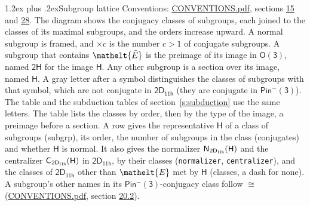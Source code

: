 \documentclass[10pt,a4paper]{article}
\makeatletter
\renewcommand\section{\@startsection{section}{1}{\z@}{-3ex plus -1ex minus -.2ex}%
  {1.2ex plus .2ex}{\normalfont\large\sffamily\bfseries\color{parttitle}}}
\numberwithin{equation}{section}
\newcommand{\eltfont}[1]{{\let\sigma\eltsigma\mathelt{#1}}}
\newcommand{\grp}[1]{\mathsf{#1}}
\newcommand{\cls}[1]{\eltfont{#1}}
\newcommand{\elt}[1]{\eltfont{#1}}
\newcommand{\samecls}{\cong}
\newcommand{\barred}[1]{\bar{#1}}
\newcommand{\hairsp}{\mkern1mu}
\makeatother
\begin{document}
\section{Subgroup lattice}\label{s:subgroups}
Conventions: \href{../../CONVENTIONS.pdf}{CONVENTIONS.pdf}, sections \href{../../../rotation/CONVENTIONS.pdf\#conv.15}{15} and \href{../../CONVENTIONS.pdf\#conv.28}{28}.
The diagram shows the conjugacy classes of subgroups, each joined to the classes of its maximal subgroups, and the orders increase upward. A normal subgroup is framed, and ${\times}c$ is the number $c > 1$ of conjugate subgroups. \label{n:group.H}A subgroup that contains $\elt{\barred{E}}$ is the preimage of its image in $\grp{O(3)}$, named $\grp{2H}$ for the image $\grp{H}$. Any other subgroup is a section over its image, named $\grp{H}$. \label{n:mark.letter}A gray letter after a symbol distinguishes the classes of subgroups with that symbol, which are not conjugate in $\grp{2D_{11h}}$ (they are conjugate in \href{Pinminus3.pdf}{$\grp{Pin^{-}(3)}$}). The table and the subduction tables of section~\ref{s:subduction} use the same letters. The table lists the classes by order, then by the type of the image, a preimage before a section. \label{n:head.subgroup}\label{n:head.order}\label{n:head.conjugates}\label{n:head.normal}A row gives the representative $\grp{H}$ of a class of subgroups (subgrp), its order, the number of subgroups in the class (conjugates) and whether $\grp{H}$ is normal. \label{n:group.normalizer}\label{n:group.centralizer}\label{n:head.classes}It also gives the normalizer $\grp{N}_{\hairsp \grp{2D_{11h}}}(\grp{H})$ and the centralizer $\grp{C}_{\hairsp \grp{2D_{11h}}}(\grp{H})$ in $\grp{2D_{11h}}$, by their classes (\texttt{normalizer}, \texttt{centralizer}), and the classes of $\grp{2D_{11h}}$ other than $\cls{E}$ met by $\grp{H}$ (classes, a dash for none). A subgroup's other names in its \href{Pinminus3.pdf}{$\grp{Pin^{-}(3)}$}-conjugacy class follow $\samecls$ (\href{../../CONVENTIONS.pdf}{CONVENTIONS.pdf}, section \href{../../CONVENTIONS.pdf\#conv.20.2}{20.2}).
\end{document}
